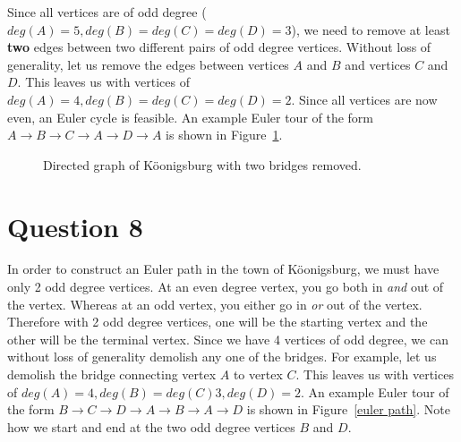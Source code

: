 \documentclass[11pt, oneside]{article}   	%
\begin{document}
Since all vertices are of odd degree ($deg(A) = 5, deg(B) = deg(C) = deg(D) = 3$), we need to remove at least \textbf{two} edges between two different pairs of odd degree vertices. Without loss of generality, let us remove the edges between vertices $A$ and $B$ and vertices $C$ and $D$. This leaves us with vertices of $deg(A) = 4, deg(B) = deg(C) = deg(D) = 2$. Since all vertices are now even, an Euler cycle is feasible. An example Euler tour of the form $A \rightarrow B \rightarrow C \rightarrow A \rightarrow D \rightarrow A$ is shown in Figure~\ref{removed}.


\begin{figure}[h]
\centering

\caption{Directed graph of K{\"o}onigsburg with two bridges removed.}
\label{removed}
\end{figure}


\cleardoublepage
\section*{Question 8}

In order to construct an Euler path in the town of K{\"o}onigsburg, we must have only 2 odd degree vertices. At an even degree vertex, you go both in \textit{and} out of the vertex. Whereas at an odd vertex, you either go in \textit{or} out of the vertex. Therefore with 2 odd degree vertices, one will be the starting vertex and the other will be the terminal vertex. Since we have 4 vertices of odd degree, we can without loss of generality demolish any one of the bridges. For example, let us demolish the bridge connecting vertex $A$ to vertex $C$. This leaves us with vertices of $deg(A) = 4, deg(B) = deg(C) 3, deg(D) = 2$. An example Euler tour of the form $B \rightarrow C \rightarrow D \rightarrow A \rightarrow B \rightarrow A \rightarrow D$ is shown in Figure~\ref{euler path}. Note how we start and end at the two odd degree vertices $B$ and $D$.
\end{document}
